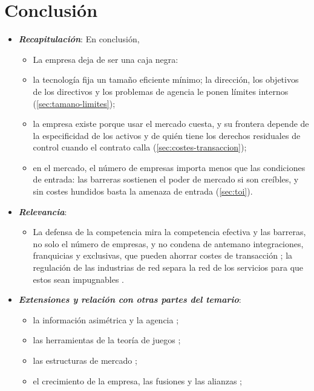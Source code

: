 \documentclass[11pt]{article}
\begin{document}
\section*{Conclusión}

\begin{itemize}
\item \textbf{\emph{Recapitulación}}: En conclusión,
  \begin{itemize}
  \item La empresa deja de ser una caja negra:
  \item la tecnología fija un tamaño eficiente mínimo; la dirección, los objetivos de los directivos y los problemas de agencia le ponen límites internos (\ref{sec:tamano-limites});
  \item la empresa existe porque usar el mercado cuesta, y su frontera depende de la especificidad de los activos y de quién tiene los derechos residuales de control cuando el contrato calla (\ref{sec:costes-transaccion});
  \item en el mercado, el número de empresas importa menos que las condiciones de entrada: las barreras sostienen el poder de mercado si son creíbles, y sin costes hundidos basta la amenaza de entrada (\ref{sec:toi}).
  \end{itemize}
\item \textbf{\emph{Relevancia}}:
  \begin{itemize}
  \item La defensa de la competencia mira la competencia efectiva y las barreras, no solo el número de empresas, y no condena de antemano integraciones, franquicias y exclusivas, que pueden ahorrar costes de transacción  ; la regulación de las industrias de red separa la red de los servicios para que estos sean impugnables .
  \end{itemize}
\item \textbf{\emph{Extensiones y relación con otras partes del temario}}:
  \begin{itemize}
  \item la información asimétrica y la agencia ;
  \item las herramientas de la teoría de juegos ;
  \item las estructuras de mercado    ;
  \item el crecimiento de la empresa, las fusiones y las alianzas ;

\end{itemize}
\end{itemize}
\end{document}
